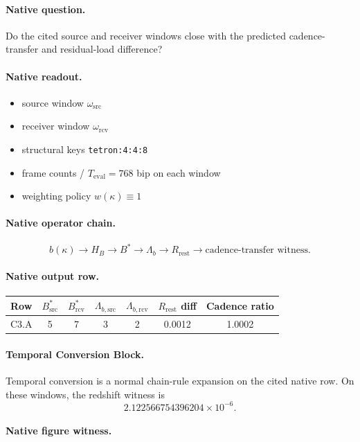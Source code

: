 \paragraph{Native question.} Do the cited source and receiver windows close with the predicted cadence-transfer and residual-load difference?
\paragraph{Native readout.}
\begin{itemize}
\item source window $\omega_{\mathrm{src}}$
\item receiver window $\omega_{\mathrm{rcv}}$
\item structural keys \texttt{tetron:4:4:8}
\item frame counts / $T_{\mathrm{eval}}=768$ bip on each window
\item weighting policy $w(\kappa)\equiv 1$
\end{itemize}
\paragraph{Native operator chain.}
\[
b(\kappa)\to H_B\to B^*\to \Lambda_b\to R_{\mathrm{rest}}\to \text{cadence-transfer witness}.
\]
\paragraph{Native output row.}
\begin{center}
\small
\begin{tabular}{lcccccc}
\toprule
Row & $B^*_{\mathrm{src}}$ & $B^*_{\mathrm{rcv}}$ & $\Lambda_{b,\mathrm{src}}$ & $\Lambda_{b,\mathrm{rcv}}$ & $R_{\mathrm{rest}}$ diff & Cadence ratio \\
\midrule
C3.A & 5 & 7 & 3 & 2 & 0.0012 & 1.0002 \\
\bottomrule
\end{tabular}
\end{center}
\paragraph{Temporal Conversion Block.} Temporal conversion is a normal chain-rule expansion on the cited native row. On these windows, the redshift witness is
\[
2.122566754396204\times 10^{-6}.
\]
\paragraph{Native figure witness.}
\begin{center}
\end{center}
